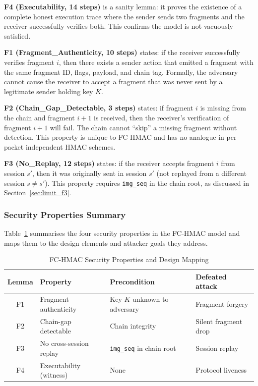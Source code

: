 \documentclass[journal]{IEEEtran}
\begin{document}
\textbf{F4 (Executability, 14 steps)} is a sanity lemma: it proves the
existence of a complete honest execution trace where the sender sends two
fragments and the receiver successfully verifies both.  This confirms the
model is not vacuously satisfied.

\textbf{F1 (Fragment\_Authenticity, 10 steps)} states: if the receiver
successfully verifies fragment $i$, then there exists a sender action that
emitted a fragment with the same fragment ID, flags, payload, and chain tag.
Formally, the adversary cannot cause the receiver to accept a fragment that
was never sent by a legitimate sender holding key $K$.

\textbf{F2 (Chain\_Gap\_Detectable, 3 steps)} states: if fragment $i$ is
missing from the chain and fragment $i+1$ is received, then the receiver's
verification of fragment $i+1$ will fail.  The chain cannot ``skip'' a missing
fragment without detection.  This property is unique to FC-HMAC and has no
analogue in per-packet independent HMAC schemes.

\textbf{F3 (No\_Replay, 12 steps)} states: if the receiver accepts fragment
$i$ from session $s'$, then it was originally sent in session $s'$ (not
replayed from a different session $s \neq s'$).  This property requires
\texttt{img\_seq} in the chain root, as discussed in
Section~\ref{sec:limit_f3}.

\subsubsection{Security Properties Summary}

Table~\ref{tab:security_props} summarises the four security properties in the
FC-HMAC model and maps them to the design elements and attacker goals they address.

\begin{table}[ht]
\centering
\caption{FC-HMAC Security Properties and Design Mapping}
\label{tab:security_props}
\begin{tabular}{cllp{2.4cm}}
\toprule
Lemma & Property & Precondition & Defeated attack \\
\midrule
F1 & Fragment authenticity & Key $K$ unknown to adversary & Fragment forgery \\
F2 & Chain-gap detectable & Chain integrity & Silent fragment drop \\
F3 & No cross-session replay & \texttt{img\_seq} in chain root & Session replay \\
F4 & Executability (witness) & None & Protocol liveness \\
\bottomrule
\end{tabular}
\end{table}
\end{document}
